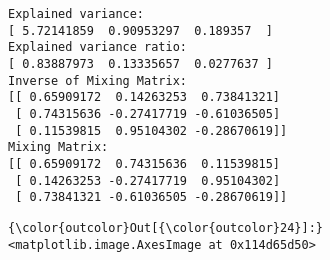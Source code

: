 \documentclass{article}
\begin{document}
    \begin{Verbatim}[commandchars=\\\{\}]
Explained variance:
[ 5.72141859  0.90953297  0.189357  ]
Explained variance ratio:
[ 0.83887973  0.13335657  0.0277637 ]
Inverse of Mixing Matrix:
[[ 0.65909172  0.14263253  0.73841321]
 [ 0.74315636 -0.27417719 -0.61036505]
 [ 0.11539815  0.95104302 -0.28670619]]
Mixing Matrix:
[[ 0.65909172  0.74315636  0.11539815]
 [ 0.14263253 -0.27417719  0.95104302]
 [ 0.73841321 -0.61036505 -0.28670619]]
    \end{Verbatim}

            \begin{Verbatim}[commandchars=\\\{\}]
{\color{outcolor}Out[{\color{outcolor}24}]:} <matplotlib.image.AxesImage at 0x114d65d50>
\end{Verbatim}
        
    \begin{center}
    \end{center}
    { \hspace*{\fill} \\}
    
\end{document}
